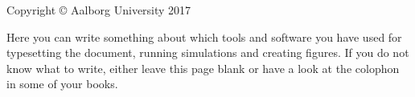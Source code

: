 \thispagestyle{empty}
{\small
\strut\vfill %
\noindent Copyright \copyright{} Aalborg University 2017\par
\vspace{0.2cm}
\noindent Here you can write something about which tools and software you have used for typesetting the document, running simulations and creating figures. If you do not know what to write, either leave this page blank or have a look at the colophon in some of your books.
}
\clearpage